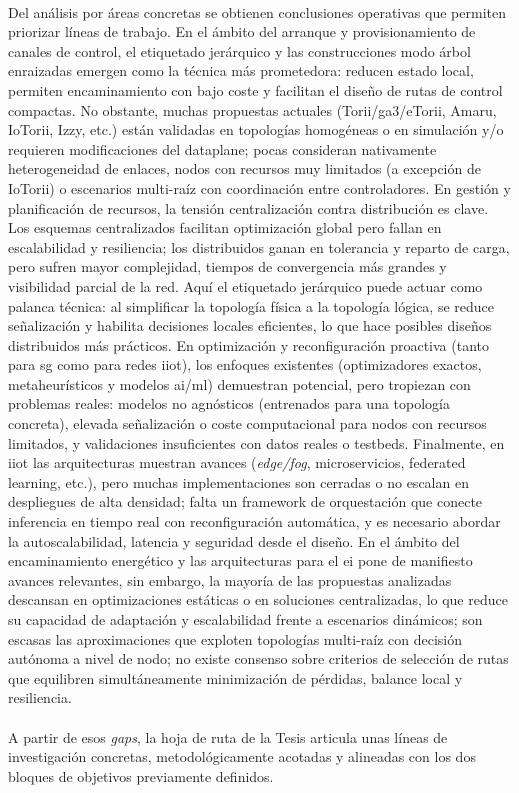 \\
Del análisis por áreas concretas se obtienen conclusiones operativas que permiten priorizar líneas de trabajo. En el ámbito del arranque y provisionamiento de canales de control, el etiquetado jerárquico y las construcciones modo árbol enraizadas emergen como la técnica más prometedora: reducen estado local, permiten encaminamiento con bajo coste y facilitan el diseño de rutas de control compactas. No obstante, muchas propuestas actuales (Torii/\gls{ga3}/eTorii, Amaru, IoTorii, Izzy, etc.) están validadas en topologías homogéneas o en simulación y/o requieren modificaciones del dataplane; pocas consideran nativamente heterogeneidad de enlaces, nodos con recursos muy limitados (a excepción de IoTorii) o escenarios multi-raíz con coordinación entre controladores. En gestión y planificación de recursos, la tensión centralización contra distribución es clave. Los esquemas centralizados facilitan optimización global pero fallan en escalabilidad y resiliencia; los distribuidos ganan en tolerancia y reparto de carga, pero sufren mayor complejidad, tiempos de convergencia más grandes y visibilidad parcial de la red. Aquí el etiquetado jerárquico puede actuar como palanca técnica: al simplificar la topología física a la topología lógica, se reduce señalización y habilita decisiones locales eficientes, lo que hace posibles diseños distribuidos más prácticos. En optimización y reconfiguración proactiva (tanto para \gls{sg} como para redes \gls{iiot}), los enfoques existentes (optimizadores exactos, metaheurísticos y modelos \gls{ai}/\gls{ml}) demuestran potencial, pero tropiezan con problemas reales: modelos no agnósticos (entrenados para una topología concreta), elevada señalización o coste computacional para nodos con recursos limitados, y validaciones insuficientes con datos reales o testbeds. Finalmente, en \gls{iiot} las arquitecturas muestran avances (\textit{edge/fog}, microservicios, federated learning, etc.), pero muchas implementaciones son cerradas o no escalan en despliegues de alta densidad; falta un framework de orquestación que conecte inferencia en tiempo real con reconfiguración automática, y es necesario abordar la autoscalabilidad, latencia y seguridad desde el diseño. En el ámbito del encaminamiento energético y las arquitecturas para el \gls{ei} pone de manifiesto avances relevantes, sin embargo, la mayoría de las propuestas analizadas descansan en optimizaciones estáticas o en soluciones centralizadas, lo que reduce su capacidad de adaptación y escalabilidad frente a escenarios dinámicos; son escasas las aproximaciones que exploten topologías multi-raíz con decisión autónoma a nivel de nodo; no existe consenso sobre criterios de selección de rutas que equilibren simultáneamente minimización de pérdidas, balance local y resiliencia.\\
\\
A partir de esos \textit{gaps}, la hoja de ruta de la Tesis articula unas líneas de investigación concretas, metodológicamente acotadas y alineadas con los dos bloques de objetivos previamente definidos.

